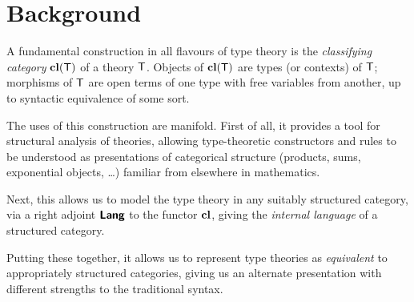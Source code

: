 
\section{Background}

\begin{para}
A fundamental construction in all flavours of type theory is the \emph{classifying category} $\mathbf{cl}(\mathsf{T})$ of a theory $\mathsf{T}$.  Objects of $\mathbf{cl}(\mathsf{T})$ are types (or contexts) of $\mathsf{T}$; morphisms of $\mathsf{T}$ are open terms of one type  with free variables from another, up to syntactic equivalence of some sort.

The uses of this construction are manifold.  First of all, it provides a tool for structural analysis of theories, allowing type-theoretic constructors and rules to be understood as presentations of categorical structure (products, sums, exponential objects, \ldots) familiar from elsewhere in mathematics.

Next, this allows us to model the type theory in any suitably structured category, via a right adjoint $\textbf{\textsf{Lang}}$ to the functor $\mathbf{cl}$, giving the \emph{internal language} of a structured category.

Putting these together, it allows us to represent type theories as \emph{equivalent} to appropriately structured categories, giving us an alternate presentation with different strengths to the traditional syntax.
\end{para}

